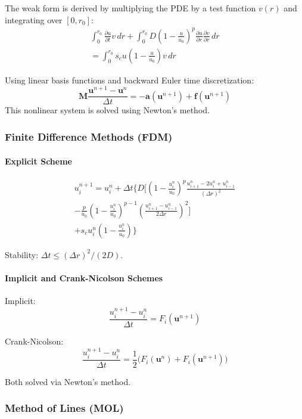 \documentclass[conference]{IEEEtran}
\begin{document}
The weak form is derived by multiplying the PDE by a test function $v(r)$ and integrating over $[0, r_0]$:
\begin{multline}
\int_0^{r_0} \frac{\partial u}{\partial t} v \, dr +
\int_0^{r_0} D \left(1 - \frac{u}{u_0}\right)^p 
\frac{\partial u}{\partial r}
\frac{\partial v}{\partial r} \, dr \\
= \int_0^{r_0} s_c u \left(1 - \frac{u}{u_0}\right) v \, dr
\end{multline}

Using linear basis functions and backward Euler time discretization:
\[
\mathbf{M} \frac{\mathbf{u}^{n+1} - \mathbf{u}^n}{\Delta t} 
= -\mathbf{a}(\mathbf{u}^{n+1}) + \mathbf{f}(\mathbf{u}^{n+1})
\]
This nonlinear system is solved using Newton’s method.

\subsubsection{\textbf{Finite Difference Methods (FDM)}}

\paragraph{Explicit Scheme}
\begin{multline}
u_i^{n+1} = u_i^n + \Delta t \bigg\{
D \bigg[
\left(1 - \frac{u_i^n}{u_0}\right)^p 
\frac{u_{i+1}^n - 2u_i^n + u_{i-1}^n}{(\Delta r)^2} \\
- \frac{p}{u_0}
\left(1 - \frac{u_i^n}{u_0}\right)^{p-1}
\left( \frac{u_{i+1}^n - u_{i-1}^n}{2 \Delta r} \right)^2 
\bigg] \\
+ s_c u_i^n \left(1 - \frac{u_i^n}{u_0}\right)
\bigg\}
\end{multline}

Stability: $\Delta t \leq (\Delta r)^2 / (2D)$.

\paragraph{Implicit and Crank-Nicolson Schemes}

Implicit:
\[
\frac{u_i^{n+1}-u_i^n}{\Delta t} = F_i(\mathbf{u}^{n+1})
\]

Crank-Nicolson:
\[
\frac{u_i^{n+1}-u_i^n}{\Delta t} = \frac{1}{2}
\big( F_i(\mathbf{u}^{n}) + F_i(\mathbf{u}^{n+1}) \big)
\]

Both solved via Newton’s method.

\subsubsection{\textbf{Method of Lines (MOL)}}
\end{document}
